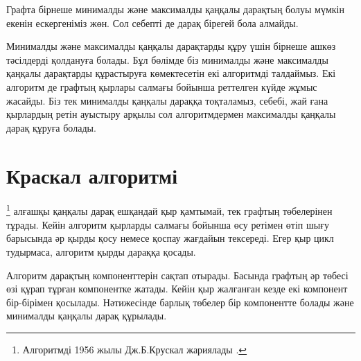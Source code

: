 Графта бірнеше минималды және максималды қаңқалы
дарақтың болуы мүмкін екенін ескергеніміз жөн. Сол себепті де дарақ бірегей бола алмайды. 

Минималды және максималды қаңқалы дарақтарды құру 
үшін бірнеше ашкөз тәсілдерді қолдануға болады.
Бұл бөлімде біз минималды және максималды
қаңқалы дарақтарды құрастыруға көмектесетін 
екі алгоритмді талдаймыз. Екі алгоритм де
графтың қырлары салмағы бойынша реттелген күйде 
жұмыс жасайды. Біз тек минималды қаңқалы дараққа тоқталамыз,
себебі, жай ғана қырлардың ретін ауыстыру арқылы
сол алгоритмдермен максималды қаңқалы дарақ
құруға болады.

\section{Краскал алгоритмі}


\footnote{Алгоритмді 1956 жылы Дж.Б.Крускал жариялады \cite{kru56}.} 
алғашқы қаңқалы дарақ ешқандай қыр қамтымай, тек
графтың төбелерінен тұрады. 
Кейін алгоритм қырларды салмағы
бойынша өсу ретімен өтіп шығу барысында
әр қырды қосу немесе қоспау жағдайын тексереді. 
Егер қыр цикл тудырмаса, алгоритм қырды дараққа қосады.


Алгоритм дарақтың компоненттерін сақтап отырады.
Басында графтың әр төбесі өзі құрап тұрған компонентке
жатады. Кейін қыр жалғанған кезде екі компонент бір-бірімен
қосылады. Нәтижесінде барлық төбелер бір компонентте болады
және минималды қаңқалы дарақ құрылады.

